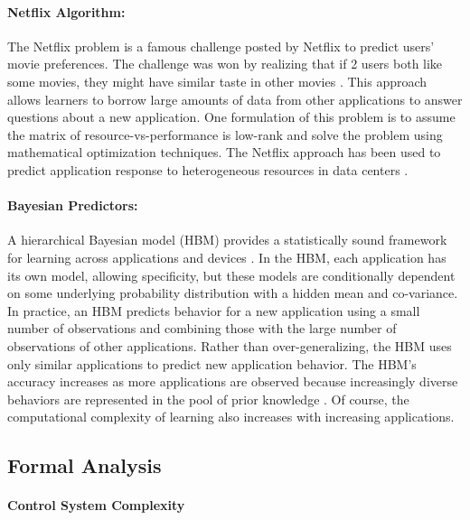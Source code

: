 \paragraph{Netflix Algorithm:}
The Netflix problem is a famous challenge posted by Netflix to predict
users' movie preferences. The challenge was won by realizing that if 2
users both like some movies, they might have similar taste in other
movies \cite{netflix}. This approach allows learners to borrow large
amounts of data from other applications to answer questions about a
new application.  One formulation of this problem is to assume the
matrix of resource-vs-performance is low-rank and solve the problem
using mathematical optimization techniques.  The Netflix approach has
been used to predict application response to heterogeneous resources
in data centers \cite{Paragon,quasar}.

\paragraph{ Bayesian Predictors:} A hierarchical Bayesian model (HBM)
provides a statistically sound framework for learning across
applications and devices
\cite{gelman2013bayesian,morris1983parametric}.  In the HBM, each
application has its own model, allowing specificity, but these models
are conditionally dependent on some underlying probability
distribution with a hidden mean and co-variance.  In practice, an HBM
predicts behavior for a new application using a small number of
observations and combining those with the large number of observations
of other applications.  Rather than over-generalizing, the HBM uses
only similar applications to predict new application behavior.  The
HBM's accuracy increases as more applications are observed because
increasingly diverse behaviors are represented in the pool of prior
knowledge \cite{LEO}.  Of course, the computational complexity of
learning also increases with increasing applications.


\subsection{Formal Analysis}
\label{sec:guarantees}
\paragraph{Control System Complexity}

